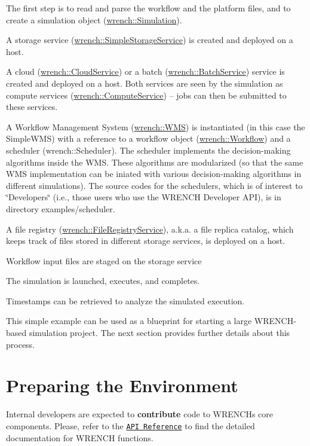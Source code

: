 \begin{DoxyItemize}
\item The first step is to read and parse the workflow and the platform files, and to create a simulation object ({\ttfamily \hyperlink{classwrench_1_1_simulation}{wrench\+::\+Simulation}}).
\item A storage service ({\ttfamily \hyperlink{classwrench_1_1_simple_storage_service}{wrench\+::\+Simple\+Storage\+Service}}) is created and deployed on a host.
\item A cloud ({\ttfamily \hyperlink{classwrench_1_1_cloud_service}{wrench\+::\+Cloud\+Service}}) or a batch ({\ttfamily \hyperlink{classwrench_1_1_batch_service}{wrench\+::\+Batch\+Service}}) service is created and deployed on a host. Both services are seen by the simulation as compute services ({\ttfamily \hyperlink{classwrench_1_1_compute_service}{wrench\+::\+Compute\+Service}}) – jobs can then be submitted to these services.
\item A Workflow Management System ({\ttfamily \hyperlink{classwrench_1_1_w_m_s}{wrench\+::\+W\+MS}}) is instantiated (in this case the {\ttfamily Simple\+W\+MS}) with a reference to a workflow object ({\ttfamily \hyperlink{classwrench_1_1_workflow}{wrench\+::\+Workflow}}) and a scheduler ({\ttfamily wrench\+::\+Scheduler}). The scheduler implements the decision-\/making algorithms inside the W\+MS. These algorithms are modularized (so that the same W\+MS implementation can be iniated with various decision-\/making algorithms in different simulations). The source codes for the schedulers, which is of interest to \char`\"{}\+Developers\char`\"{} (i.\+e., those users who use the W\+R\+E\+N\+CH Developer A\+PI), is in directory {\ttfamily examples/scheduler}.
\item A file registry ({\ttfamily \hyperlink{classwrench_1_1_file_registry_service}{wrench\+::\+File\+Registry\+Service}}), a.\+k.\+a. a file replica catalog, which keeps track of files stored in different storage services, is deployed on a host.
\item Workflow input files are staged on the storage service
\item The simulation is launched, executes, and completes.
\item Timestamps can be retrieved to analyze the simulated execution.
\end{DoxyItemize}

This simple example can be used as a blueprint for starting a large W\+R\+E\+N\+C\+H-\/based simulation project. The next section provides further details about this process.\hypertarget{getting-started_getting-started-prep}{}\section{Preparing the Environment}\label{getting-started_getting-started-prep}
Internal developers are expected to {\bfseries contribute} code to W\+R\+E\+N\+CH\textquotesingle{}s core components. Please, refer to the \href{./annotated.html}{\tt A\+PI Reference} to find the detailed documentation for W\+R\+E\+N\+CH functions.

